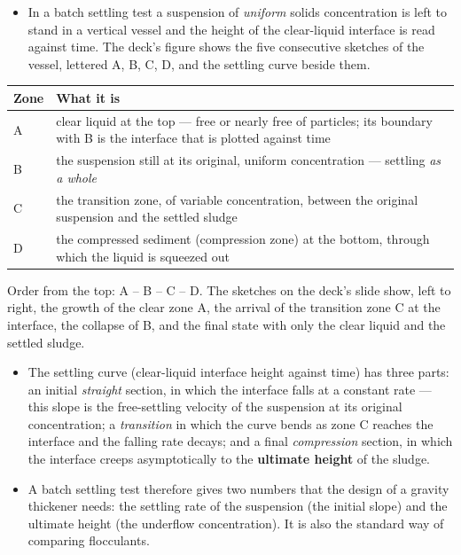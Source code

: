 \documentclass[10pt,a4paper]{article}
\newcommand{\spsub}[1]{\par\addvspace{7pt}\noindent{\color{accent}\bfseries #1}\par\addvspace{3pt}\nopagebreak}
\begin{document}
\spsub{Batch sedimentation --- the four zones}
\begin{itemize}
  \item In a batch settling test a suspension of \emph{uniform} solids concentration is left to stand in a vertical vessel and the height of the clear-liquid interface is read against time. The deck's figure shows the five consecutive sketches of the vessel, lettered A, B, C, D, and the settling curve beside them.
\end{itemize}
\begin{formulabox}
{\small
\begin{tabularx}{\linewidth}{@{}lX@{}}
\toprule
\textbf{Zone} & \textbf{What it is}\\
\midrule
A & clear liquid at the top --- free or nearly free of particles; its boundary with B is the interface that is plotted against time\\
B & the suspension still at its original, uniform concentration --- settling \emph{as a whole}\\
C & the transition zone, of variable concentration, between the original suspension and the settled sludge\\
D & the compressed sediment (compression zone) at the bottom, through which the liquid is squeezed out\\
\bottomrule
\end{tabularx}}
\vspace{2pt}
{\small Order from the top: A -- B -- C -- D. The sketches on the deck's slide show, left to right, the growth of the clear zone A, the arrival of the transition zone C at the interface, the collapse of B, and the final state with only the clear liquid and the settled sludge.}
\end{formulabox}
\begin{itemize}
  \item The settling curve (clear-liquid interface height against time) has three parts: an initial \emph{straight} section, in which the interface falls at a constant rate --- this slope is the free-settling velocity of the suspension at its original concentration; a \emph{transition} in which the curve bends as zone C reaches the interface and the falling rate decays; and a final \emph{compression} section, in which the interface creeps asymptotically to the \textbf{ultimate height} of the sludge.
  \item A batch settling test therefore gives two numbers that the design of a gravity thickener needs: the settling rate of the suspension (the initial slope) and the ultimate height (the underflow concentration). It is also the standard way of comparing flocculants.
\end{itemize}
\end{document}
